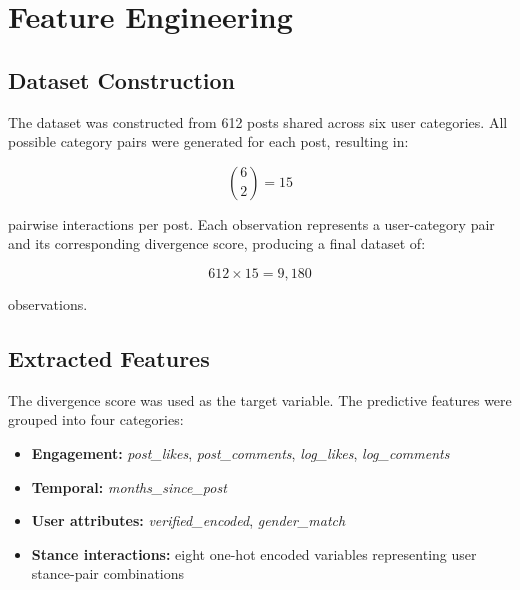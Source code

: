\section{Feature Engineering}

\subsection{Dataset Construction}

The dataset was constructed from 612 posts shared across six user categories. All possible category pairs were generated for each post, resulting in:

\[
\binom{6}{2}=15
\]

pairwise interactions per post. Each observation represents a user-category pair and its corresponding divergence score, producing a final dataset of:

\[
612 \times 15 = 9,180
\]

observations.

\subsection{Extracted Features}

The divergence score was used as the target variable. The predictive features were grouped into four categories:

\begin{itemize}
    \item \textbf{Engagement:} \textit{post\_likes}, \textit{post\_comments}, \textit{log\_likes}, \textit{log\_comments}
    \item \textbf{Temporal:} \textit{months\_since\_post}
    \item \textbf{User attributes:} \textit{verified\_encoded}, \textit{gender\_match}
    \item \textbf{Stance interactions:} eight one-hot encoded variables representing user stance-pair combinations
\end{itemize}